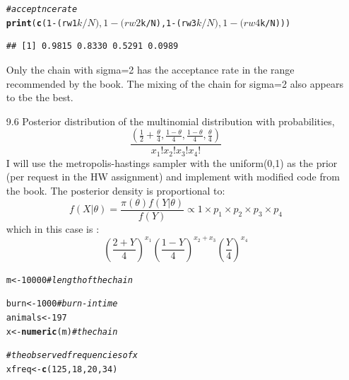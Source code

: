 \documentclass{article}\usepackage[]{graphicx}\usepackage[]{color}
\makeatletter
\newcommand{\hlcom}[1]{\textcolor[rgb]{0.678,0.584,0.686}{\textit{#1}}}%
\newcommand{\hlkwd}[1]{\textcolor[rgb]{0.737,0.353,0.396}{\textbf{#1}}}%
\newenvironment{kframe}{%
 \def\at@end@of@kframe{}%
 \ifinner\ifhmode%
  \def\at@end@of@kframe{\end{minipage}}%
  \begin{minipage}{\columnwidth}%
 \fi\fi%
 \def\FrameCommand##1{\hskip\@totalleftmargin \hskip-\fboxsep
 \colorbox{shadecolor}{##1}\hskip-\fboxsep
     \hskip-\linewidth \hskip-\@totalleftmargin \hskip\columnwidth}%
 \MakeFramed {\advance\hsize-\width
   \@totalleftmargin\z@ \linewidth\hsize
   \@setminipage}}%
 {\par\unskip\endMakeFramed%
 \at@end@of@kframe}
\newenvironment{knitrout}{}{} %
\makeatother
\begin{document}
\begin{itemize}
\begin{knitrout}
\color{fgcolor}\begin{kframe}
\begin{alltt}
\hlcom{# acceptnce rate}
\hlkwd{print}(\hlkwd{c}(1 - (rw1$k/N), 1 - (rw2$k/N), 1 - (rw3$k/N), 1 - (rw4$k/N)))
\end{alltt}
\begin{verbatim}
## [1] 0.9815 0.8330 0.5291 0.0989
\end{verbatim}
\end{kframe}
\end{knitrout}

Only the chain with sigma=2 has the acceptance rate in the range recommended by the book.  The mixing of the chain for sigma=2 also appears to tbe the best.\\

\item[9.6]  Posterior distribution of the multinomial distribution with probabilities,
$$\frac{\left(\frac{1}{2}+\frac{\theta}{4},\frac{1-\theta}{4},\frac{1-\theta}{4},\frac{\theta}{4}\right)}{x_1!x_2!x_3!x_4!}$$
I will use the metropolis-hastings sampler with the uniform(0,1) as the prior (per request in the HW assignment) and implement with modified code from the book.  The posterior density is proportional to:
$$f(X|\theta) = \frac{\pi(\theta)f(Y|\theta)}{f(Y)} \propto 1 \times p_1 \times p_2 \times p_3 \times p_4$$
which in this case is :\\
$$\left(\frac{2+Y}{4}\right)^{x_1}\left(\frac{1-Y}{4}\right)^{x_2+x_3}\left(\frac{Y}{4}\right)^{x_4}$$


\begin{knitrout}
\color{fgcolor}\begin{kframe}
\begin{alltt}
m <- 10000  \hlcom{#length of the chain}

burn <- 1000  \hlcom{#burn-in time}
animals <- 197
x <- \hlkwd{numeric}(m)  \hlcom{#the chain}

\hlcom{# the observed frequencies of x}
xfreq <- \hlkwd{c}(125, 18, 20, 34)


\end{alltt}
\end{kframe}
\end{knitrout}
\end{itemize}
\end{document}
